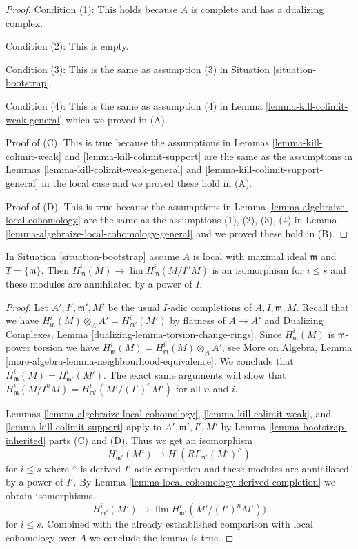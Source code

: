 \begin{proof}
\medskip\noindent
Condition (1): This holds because $A$ is complete and has a dualizing complex.

\medskip\noindent
Condition (2): This is empty.

\medskip\noindent
Condition (3): This is the same as assumption (3) in
Situation \ref{situation-bootstrap}.

\medskip\noindent
Condition (4): This is the same as assumption (4) in
Lemma \ref{lemma-kill-colimit-weak-general} which we proved in (A).

\medskip\noindent
Proof of (C). This is true because the assumptions in
Lemmas \ref{lemma-kill-colimit-weak} and \ref{lemma-kill-colimit-support}
are the same as the assumptions in
Lemmas \ref{lemma-kill-colimit-weak-general} and
\ref{lemma-kill-colimit-support-general} in the local case
and we proved these hold in (A).

\medskip\noindent
Proof of (D). This is true because the assumptions in
Lemma \ref{lemma-algebraize-local-cohomology}
are the same as the assumptions (1), (2), (3), (4) in
Lemma \ref{lemma-algebraize-local-cohomology-general}
and we proved these hold in (B).
\end{proof}

\begin{lemma}
\label{lemma-algebraize-local-cohomology-bis}
In Situation \ref{situation-bootstrap} assume $A$ is local with
maximal ideal $\mathfrak m$ and $T = \{\mathfrak m\}$. Then
$H^i_\mathfrak m(M) \to \lim H^i_\mathfrak m(M/I^nM)$
is an isomorphism for $i \leq s$ and these modules are
annihilated by a power of $I$.
\end{lemma}

\begin{proof}
Let $A', I', \mathfrak m', M'$ be the usual $I$-adic completions
of $A, I, \mathfrak m, M$. Recall that we have
$H^i_\mathfrak m(M) \otimes_A A' = H^i_{\mathfrak m'}(M')$
by flatness of $A \to A'$ and Dualizing Complexes, Lemma
\ref{dualizing-lemma-torsion-change-rings}.
Since $H^i_\mathfrak m(M)$ is $\mathfrak m$-power torsion we have
$H^i_\mathfrak m(M) = H^i_\mathfrak m(M) \otimes_A A'$, see
More on Algebra, Lemma \ref{more-algebra-lemma-neighbourhood-equivalence}.
We conclude that $H^i_\mathfrak m(M) = H^i_{\mathfrak m'}(M')$.
The exact same arguments will show that
$H^i_\mathfrak m(M/I^nM) =  H^i_{\mathfrak m'}(M'/(I')^nM')$
for all $n$ and $i$.

\medskip\noindent
Lemmas \ref{lemma-algebraize-local-cohomology},
\ref{lemma-kill-colimit-weak}, and
\ref{lemma-kill-colimit-support}
apply to $A', \mathfrak m', I', M'$ by
Lemma \ref{lemma-bootstrap-inherited} parts (C) and (D).
Thus we get an isomorphism
$$
H^i_{\mathfrak m'}(M') \longrightarrow H^i(R\Gamma_{\mathfrak m'}(M')^\wedge)
$$
for $i \leq s$ where ${}^\wedge$ is derived $I'$-adic completion and these
modules are annihilated by a power of $I'$.
By Lemma \ref{lemma-local-cohomology-derived-completion}
we obtain isomorphisms
$$
H^i_{\mathfrak m'}(M') \longrightarrow
\lim H^i_{\mathfrak m'}(M'/(I')^nM'))
$$
for $i \leq s$. Combined with the already esthablished comparison
with local cohomology over $A$ we conclude the lemma is true.
\end{proof}

